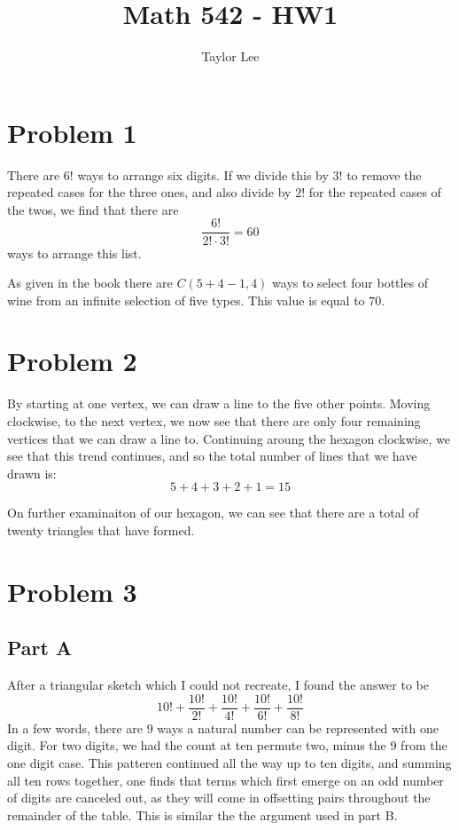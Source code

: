 \documentclass[12pt,a5paper]{article}
\title{\usefont{T1}{bch}{b}{n} Math 542 - HW1}         %
\author{Taylor Lee}      %
\begin{document}
\maketitle                      %

\lstset{breaklines=true}

\setcounter{secnumdepth}{0}

\section*{Problem 1}
There are $6!$ ways to arrange six digits. If we divide this by $3!$ to remove the repeated cases for the three ones, and also divide by $2!$ for the repeated cases of the twos, we find that there are
\[
\frac{6!}{2! \cdot 3!} = 60
\]
ways to arrange this list.

As given in the book there are $C(5 + 4 -1,4)$ ways to select four bottles of wine from an infinite selection of five types. This value is equal to $70$.

\section*{Problem 2}
By starting at one vertex, we can draw a line to the five other points. Moving clockwise, to the next vertex, we now see that there are only four remaining vertices that we can draw a line to. Continuing aroung the hexagon clockwise, we see that this trend continues, and so the total number of lines that we have drawn is:
\[
5 + 4 + 3 + 2 + 1 = 15
\] 

On further examinaiton of our hexagon, we can see that there are a total of twenty triangles that have formed.


\section*{Problem 3}
\subsection*{Part A}
After a triangular sketch which I could not recreate, I found the answer to be
\[
10! + \frac{10!}{2!} + \frac{10!}{4!} + \frac{10!}{6!} + \frac{10!}{8!}
\]
In a few words, there are 9 ways a natural number can be represented with one digit. For two digits, we had the count at ten permute two, minus the 9 from the one digit case. This patteren continued all the way up to ten digits, and summing all ten rows together, one finds that terms which first emerge on an odd number of digits are canceled out, as they will come in offsetting pairs throughout the remainder of the table. This is similar the the argument used in part B.
\end{document}
